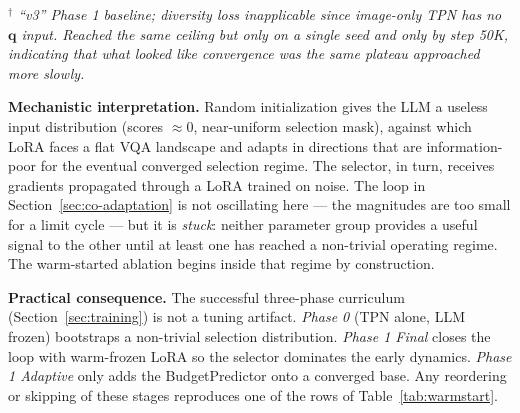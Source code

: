 \documentclass{article}
\newcommand{\qemb}{\mathbf{q}}
\begin{document}
\begin{table}[t]
\caption{Warm-start vs.\ from-scratch outcomes on the joint
TPN+LoRA+projector system. ``Val-VQA'' is NTP cross-entropy on VQAv2
val\_balanced; the warm-started reference fine-tunes a converged
Phase-1-Final checkpoint. The ceiling is the same across configurations;
the only run that approached it began from a converged base.}
\label{tab:warmstart}
\vskip 0.1in
\centering
{}
\vskip -0.04in
\small{\textit{$^\dagger$ ``v3'' Phase 1 baseline; diversity loss
inapplicable since image-only TPN has no $\qemb$ input. Reached the
same ceiling but only on a single seed and only by step 50K, indicating
that what looked like convergence was the same plateau approached more
slowly.}}
\end{table}

\textbf{Mechanistic interpretation.}
Random initialization gives the LLM a useless input distribution
(scores $\approx 0$, near-uniform selection mask), against which LoRA
faces a flat VQA landscape and adapts in directions that are
information-poor for the eventual converged selection regime. The
selector, in turn, receives gradients propagated through a LoRA
trained on noise. The loop in Section~\ref{sec:co-adaptation} is not
oscillating here — the magnitudes are too small for a limit cycle —
but it is \emph{stuck}: neither parameter group provides a useful
signal to the other until at least one has reached a non-trivial
operating regime. The warm-started ablation begins inside that
regime by construction.

\textbf{Practical consequence.}
The successful three-phase curriculum (Section~\ref{sec:training}) is
not a tuning artifact. \emph{Phase 0} (TPN alone, LLM frozen) bootstraps
a non-trivial selection distribution. \emph{Phase 1 Final} closes the
loop with warm-frozen LoRA so the selector dominates the early
dynamics. \emph{Phase 1 Adaptive} only adds the BudgetPredictor onto a
converged base. Any reordering or skipping of these stages reproduces
one of the rows of Table~\ref{tab:warmstart}.
\end{document}
